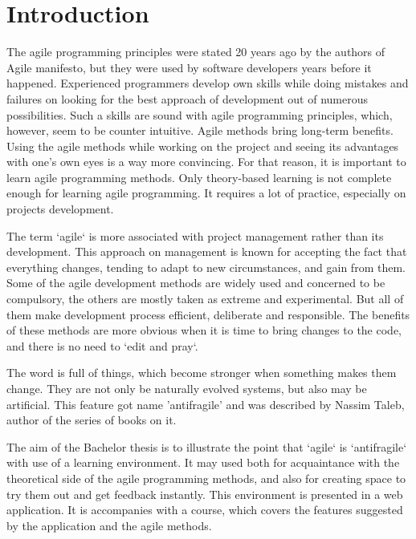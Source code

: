 \chapter*{Introduction} %

The agile programming principles were stated 20 years ago by the authors of Agile manifesto, but they were used by software developers years before it happened. Experienced programmers develop own skills while doing mistakes and failures on looking for the best approach of development out of numerous possibilities. Such a skills are sound with agile programming principles, which, however, seem to be counter intuitive. Agile methods bring long-term benefits. Using the agile methods while working on the project and seeing its advantages with one's own eyes is a way more convincing. For that reason, it is important to learn agile programming methods. Only theory-based learning is not complete enough for learning agile programming. It requires a lot of practice, especially on projects development.

The term `agile` is more associated with project management rather than its development. This approach on management is known for accepting the fact that everything changes, tending to adapt to new circumstances, and gain from them. Some of the agile development methods are widely used and concerned to be compulsory, the others are mostly taken as extreme and experimental. But all of them make development process efficient, deliberate and responsible. The benefits of these methods are more obvious when it is time to bring changes to the code, and there is no need to `edit and pray`.

The word is full of things, which become stronger when something makes them change. They are not only be naturally evolved systems, but also may be artificial. This feature got name 'antifragile' and was described by Nassim Taleb, author of the series of books on it.

The aim of the Bachelor thesis is to illustrate the point that `agile` is `antifragile` with use of a learning environment. It may used both for acquaintance with the theoretical side of the agile programming methods, and also for creating space to try them out and get feedback instantly. This environment is presented in a web application. It is accompanies with a course, which covers the features suggested by the application and the agile methods.

